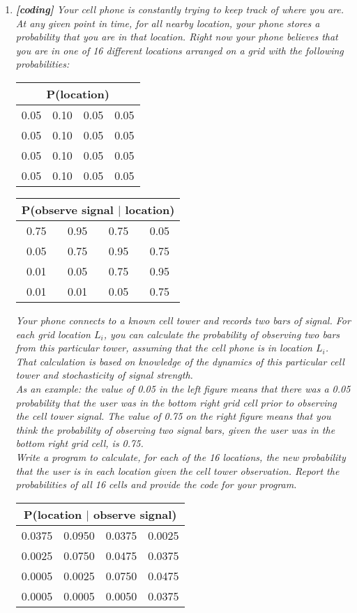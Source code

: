 \documentclass{article} %
\begin{document}
\begin{enumerate}
	\item \textit{\textbf{[coding]} Your cell phone is constantly trying to keep track of where you are. At any given point in time, for all nearby location, your phone stores a probability that you are in that location. Right now your phone believes that you are in one of 16 different locations arranged on a grid with the following probabilities:}
	\begin{center}
	\begin{tabular}{|c|c|c|c|}
	\multicolumn{4}{c}{P(location)}\\
	\hline
	0.05 & 0.10 & 0.05 & 0.05\\
	\hline
	0.05 & 0.10 & 0.05 & 0.05\\
	\hline
	0.05 & 0.10 & 0.05 & 0.05\\
	\hline
	0.05 & 0.10 & 0.05 & 0.05\\
	\hline
	\end{tabular}
	\begin{tabular}{|c|c|c|c|}
	\multicolumn{4}{c}{P(observe signal $|$ location)}\\
	\hline
	0.75 & 0.95 & 0.75 & 0.05\\
	\hline
	0.05 & 0.75 & 0.95 & 0.75\\
	\hline
	0.01 & 0.05 & 0.75 & 0.95\\
	\hline
	0.01 & 0.01 & 0.05 & 0.75\\
	\hline
	\end{tabular}
	\end{center}
	
	\textit{Your phone connects to a known cell tower and records two bars of signal. For each grid location $L_i$, you can calculate the probability of observing two bars from this particular tower, assuming that the cell phone is in location $L_i$. That calculation is based on knowledge of the dynamics of this particular cell tower and stochasticity of signal strength.\\
	As an example: the value of 0.05 in the left figure means that there was a 0.05 probability that the user was in the bottom right grid cell prior to observing the cell tower signal. The value of 0.75 on the right figure means that you think the probability of observing two signal bars, given the user was in the bottom right grid cell, is 0.75.\\
	Write a program to calculate, for each of the 16 locations, the new probability that the user is in each location given the cell tower observation. Report the probabilities of all 16 cells and provide the code for your program.}
	\begin{center}	
	\begin{tabular}{|c|c|c|c|}
	\multicolumn{4}{c}{P(location $|$ observe signal)}\\
	\hline
	0.0375 & 0.0950 & 0.0375 & 0.0025\\
	\hline
	0.0025 & 0.0750 & 0.0475 & 0.0375\\
	\hline
	0.0005 & 0.0025 & 0.0750 & 0.0475\\
	\hline
	0.0005 & 0.0005 & 0.0050 & 0.0375\\
	\hline
	\end{tabular}
	\end{center}	
	
\end{enumerate}
\end{document}
